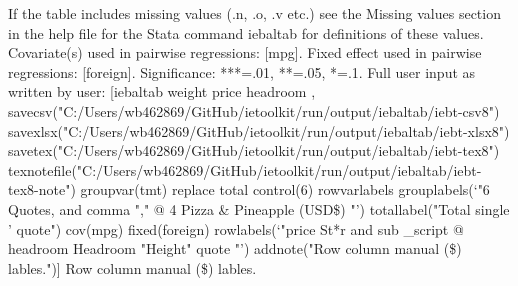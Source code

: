 If the table includes missing values (.n, .o, .v etc.) see the Missing values section in the help file for the Stata command iebaltab for definitions of these values. Covariate(s) used in pairwise regressions: [mpg]. Fixed effect used in pairwise regressions: [foreign]. Significance: ***=.01, **=.05, *=.1. Full user input as written by user: [iebaltab weight price headroom , savecsv("C:/Users/wb462869/GitHub/ietoolkit/run/output/iebaltab/iebt-csv8") savexlsx("C:/Users/wb462869/GitHub/ietoolkit/run/output/iebaltab/iebt-xlsx8") savetex("C:/Users/wb462869/GitHub/ietoolkit/run/output/iebaltab/iebt-tex8") texnotefile("C:/Users/wb462869/GitHub/ietoolkit/run/output/iebaltab/iebt-tex8-note") groupvar(tmt) replace total control(6) rowvarlabels grouplabels(`"6 Quotes, and comma "," @ 4 Pizza \& Pineapple (USD\$) "') totallabel("Total single ' quote") cov(mpg) fixed(foreign) rowlabels(`"price St*r and sub \_script @ headroom Headroom "Height" quote "') addnote("Row column manual (\$) lables.")] Row column manual (\$) lables.
